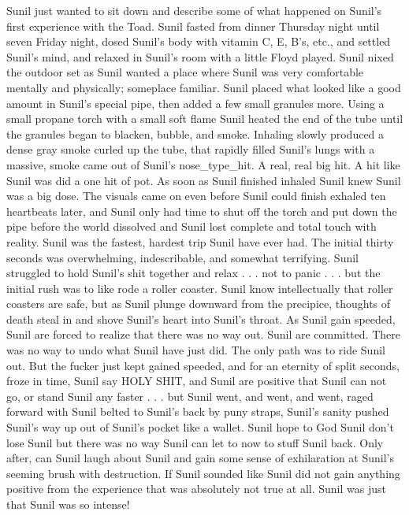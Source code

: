 \documentclass[12pt]{book}
\begin{document}
Sunil just wanted to sit down and describe some of what happened on Sunil's first experience with the Toad. Sunil fasted from dinner Thursday night until seven Friday night, dosed Sunil's body with vitamin C, E, B's, etc., and settled Sunil's mind, and relaxed in Sunil's room with a little Floyd played. Sunil nixed the outdoor set as Sunil wanted a place where Sunil was very comfortable mentally and physically; someplace familiar. Sunil placed what looked like a good amount in Sunil's special pipe, then added a few small granules more. Using a small propane torch with a small soft flame Sunil heated the end of the tube until the granules began to blacken, bubble, and smoke. Inhaling slowly produced a dense gray smoke curled up the tube, that rapidly filled Sunil's lungs with a massive, smoke came out of Sunil's nose\_type\_hit. A real, real big hit. A hit like Sunil was did a one hit of pot. As soon as Sunil finished inhaled Sunil knew Sunil was a big dose. The visuals came on even before Sunil could finish exhaled ten heartbeats later, and Sunil only had time to shut off the torch and put down the pipe before the world dissolved and Sunil lost complete and total touch with reality. Sunil was the fastest, hardest trip Sunil have ever had. The initial thirty seconds was overwhelming, indescribable, and somewhat terrifying. Sunil struggled to hold Sunil's shit together and relax . . .  not to panic . . .  but the initial rush was to like rode a roller coaster. Sunil know intellectually that roller coasters are safe, but as Sunil plunge downward from the precipice, thoughts of death steal in and shove Sunil's heart into Sunil's throat. As Sunil gain speeded, Sunil are forced to realize that there was no way out. Sunil are committed. There was no way to undo what Sunil have just did. The only path was to ride Sunil out. But the fucker just kept gained speeded, and for an eternity of split seconds, froze in time, Sunil say HOLY SHIT, and Sunil are positive that Sunil can not go, or stand Sunil any faster . . .  but Sunil went, and went, and went, raged forward with Sunil belted to Sunil's back by puny straps, Sunil's sanity pushed Sunil's way up out of Sunil's pocket like a wallet. Sunil hope to God Sunil don't lose Sunil but there was no way Sunil can let to now to stuff Sunil back. Only after, can Sunil laugh about Sunil and gain some sense of exhilaration at Sunil's seeming brush with destruction. If Sunil sounded like Sunil did not gain anything positive from the experience that was absolutely not true at all. Sunil was just that Sunil was so intense!
\end{document}
